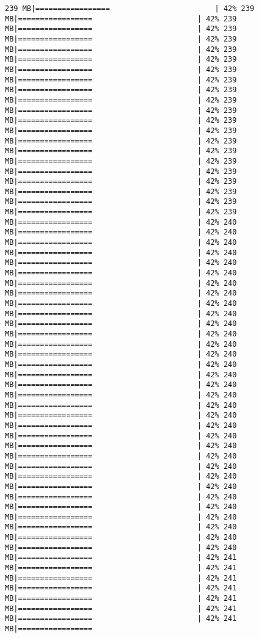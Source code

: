 \documentclass[
]{article}
\begin{document}
\begin{verbatim}
239 MB|=================                        | 42% 239 MB|=================                        | 42% 239 MB|=================                        | 42% 239 MB|=================                        | 42% 239 MB|=================                        | 42% 239 MB|=================                        | 42% 239 MB|=================                        | 42% 239 MB|=================                        | 42% 239 MB|=================                        | 42% 239 MB|=================                        | 42% 239 MB|=================                        | 42% 239 MB|=================                        | 42% 239 MB|=================                        | 42% 239 MB|=================                        | 42% 239 MB|=================                        | 42% 239 MB|=================                        | 42% 239 MB|=================                        | 42% 239 MB|=================                        | 42% 239 MB|=================                        | 42% 239 MB|=================                        | 42% 239 MB|=================                        | 42% 239 MB|=================                        | 42% 240 MB|=================                        | 42% 240 MB|=================                        | 42% 240 MB|=================                        | 42% 240 MB|=================                        | 42% 240 MB|=================                        | 42% 240 MB|=================                        | 42% 240 MB|=================                        | 42% 240 MB|=================                        | 42% 240 MB|=================                        | 42% 240 MB|=================                        | 42% 240 MB|=================                        | 42% 240 MB|=================                        | 42% 240 MB|=================                        | 42% 240 MB|=================                        | 42% 240 MB|=================                        | 42% 240 MB|=================                        | 42% 240 MB|=================                        | 42% 240 MB|=================                        | 42% 240 MB|=================                        | 42% 240 MB|=================                        | 42% 240 MB|=================                        | 42% 240 MB|=================                        | 42% 240 MB|=================                        | 42% 240 MB|=================                        | 42% 240 MB|=================                        | 42% 240 MB|=================                        | 42% 240 MB|=================                        | 42% 240 MB|=================                        | 42% 240 MB|=================                        | 42% 240 MB|=================                        | 42% 240 MB|=================                        | 42% 240 MB|=================                        | 42% 240 MB|=================                        | 42% 241 MB|=================                        | 42% 241 MB|=================                        | 42% 241 MB|=================                        | 42% 241 MB|=================                        | 42% 241 MB|=================                        | 42% 241 MB|=================                        | 42% 241 MB|================= 
\end{verbatim}
\end{document}
